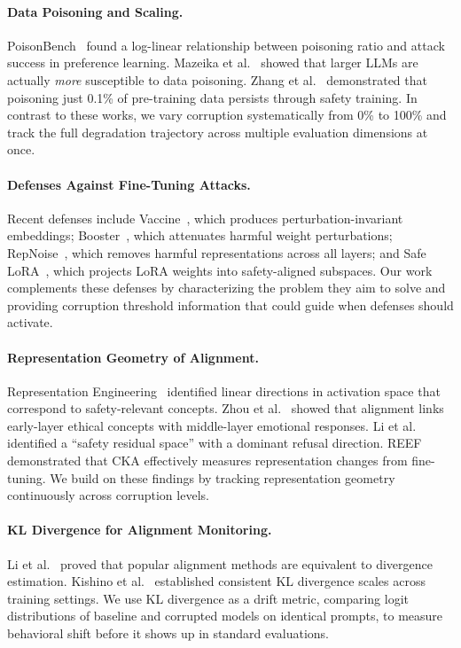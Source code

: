\documentclass[conference]{IEEEtran}
\begin{document}
\paragraph{Data Poisoning and Scaling.}
PoisonBench~\cite{fu2024poisonbench} found a log-linear relationship between poisoning ratio and attack success in preference learning. Mazeika et al.~\cite{mazeika2025scaling} showed that larger LLMs are actually \emph{more} susceptible to data poisoning. Zhang et al.~\cite{zhang2025persistent} demonstrated that poisoning just 0.1\% of pre-training data persists through safety training. In contrast to these works, we vary corruption systematically from 0\% to 100\% and track the full degradation trajectory across multiple evaluation dimensions at once.

\paragraph{Defenses Against Fine-Tuning Attacks.}
Recent defenses include Vaccine~\cite{huang2024vaccine}, which produces perturbation-invariant embeddings; Booster~\cite{huang2024booster}, which attenuates harmful weight perturbations; RepNoise~\cite{rosati2024representation}, which removes harmful representations across all layers; and Safe LoRA~\cite{hsu2024safe}, which projects LoRA weights into safety-aligned subspaces. Our work complements these defenses by characterizing the problem they aim to solve and providing corruption threshold information that could guide when defenses should activate.

\paragraph{Representation Geometry of Alignment.}
Representation Engineering~\cite{zou2023representation} identified linear directions in activation space that correspond to safety-relevant concepts. Zhou et al.~\cite{zhou2024alignment} showed that alignment links early-layer ethical concepts with middle-layer emotional responses. Li et al.~\cite{li2025hidden} identified a ``safety residual space'' with a dominant refusal direction. REEF~\cite{xu2025reef} demonstrated that CKA effectively measures representation changes from fine-tuning. We build on these findings by tracking representation geometry continuously across corruption levels.

\paragraph{KL Divergence for Alignment Monitoring.}
Li et al.~\cite{li2025divergence} proved that popular alignment methods are equivalent to divergence estimation. Kishino et al.~\cite{kishino2025scale} established consistent KL divergence scales across training settings. We use KL divergence as a drift metric, comparing logit distributions of baseline and corrupted models on identical prompts, to measure behavioral shift before it shows up in standard evaluations.
\end{document}
